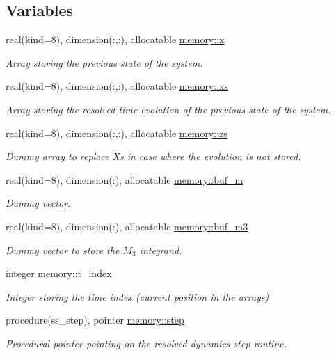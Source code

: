 \subsection*{Variables}
\begin{DoxyCompactItemize}
\item 
real(kind=8), dimension(\+:,\+:), allocatable \hyperlink{namespacememory_aa7e328e0fcaf0f4fdf9dc450ccfdfd5b}{memory\+::x}
\begin{DoxyCompactList}\small\item\em Array storing the previous state of the system. \end{DoxyCompactList}\item 
real(kind=8), dimension(\+:,\+:), allocatable \hyperlink{namespacememory_ab57f9b5df41de423255f146f2cf3220a}{memory\+::xs}
\begin{DoxyCompactList}\small\item\em Array storing the resolved time evolution of the previous state of the system. \end{DoxyCompactList}\item 
real(kind=8), dimension(\+:,\+:), allocatable \hyperlink{namespacememory_a7ea83fadf351bfaa6c8ec2540cb80a87}{memory\+::zs}
\begin{DoxyCompactList}\small\item\em Dummy array to replace Xs in case where the evolution is not stored. \end{DoxyCompactList}\item 
real(kind=8), dimension(\+:), allocatable \hyperlink{namespacememory_a533d8a2daef9b9feb5ee1cad8b2ae0c7}{memory\+::buf\+\_\+m}
\begin{DoxyCompactList}\small\item\em Dummy vector. \end{DoxyCompactList}\item 
real(kind=8), dimension(\+:), allocatable \hyperlink{namespacememory_a69ca63c73a29fb91cce2a4c640c94403}{memory\+::buf\+\_\+m3}
\begin{DoxyCompactList}\small\item\em Dummy vector to store the $M_3$ integrand. \end{DoxyCompactList}\item 
integer \hyperlink{namespacememory_a44d4dddcb5f5cbcbab4164c85448193d}{memory\+::t\+\_\+index}
\begin{DoxyCompactList}\small\item\em Integer storing the time index (current position in the arrays) \end{DoxyCompactList}\item 
procedure(ss\+\_\+step), pointer \hyperlink{namespacememory_ab1b54ce36a854642cb662080f609a897}{memory\+::step}
\begin{DoxyCompactList}\small\item\em Procedural pointer pointing on the resolved dynamics step routine. \end{DoxyCompactList}\end{DoxyCompactItemize}
